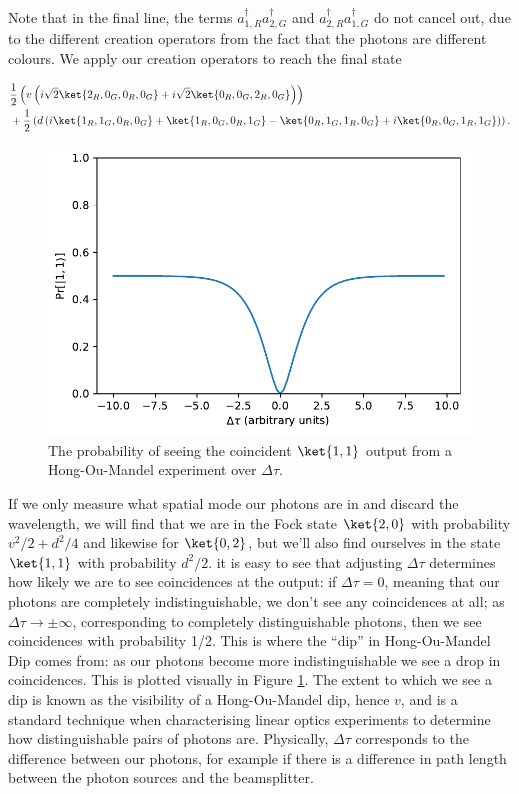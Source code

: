 Note that in the final line, the terms $a_{1,R}^\dagger a_{2,G}^\dagger$ and $a_{2,R}^\dagger a_{1,G}^\dagger$ do not cancel out, due to the different creation operators from the fact that the photons are different colours. We apply our creation operators to reach the final state

\begin{align}
&\frac{1}{2}\left(v\left(i\sqrt{2}\ket{2_R,0_G,0_R,0_G} +i\sqrt{2}\ket{0_R,0_G,2_R,0_G}\right)\right)\nonumber\\
&+\frac{1}{2}\left( d\left(i\ket{1_R,1_G,0_R,0_G} + \ket{1_R,0_G,0_R,1_G} - \ket{0_R,1_G,1_R,0_G}+i\ket{0_R,0_G,1_R,1_G} \right)\right).
\end{align}

\begin{figure}
\begin{center}
\includegraphics[width=0.5\linewidth]{preliminary_bs/hom_plot}
\end{center}
\caption{\label{fig:hom-plot}The probability of seeing the coincident $\ket{1,1}$ output from a Hong-Ou-Mandel experiment over $\Delta\tau$.}
\end{figure}

If we only measure what spatial mode our photons are in and discard the wavelength, we will find that we are in the Fock state $\ket{2,0}$ with probability $v^2/2 + d^2/4$ and likewise for $\ket{0,2}$, but we'll also find ourselves in the state $\ket{1,1}$ with probability $d^2/2$.  it is easy to see that adjusting $\Delta\tau$ determines how likely we are to see coincidences at the output: if $\Delta\tau=0$, meaning that our photons are completely indistinguishable, we don't see any coincidences at all; as $\Delta\tau\rightarrow\pm\infty$, corresponding to completely distinguishable photons, then we see coincidences with probability 1/2. This is where the ``dip'' in Hong-Ou-Mandel Dip comes from: as our photons become more indistinguishable we see a drop in coincidences. This is plotted visually in Figure \ref{fig:hom-plot}. The extent to which we see a dip is known as the visibility of a Hong-Ou-Mandel dip, hence $v$, and is a standard technique when characterising linear optics experiments to determine how distinguishable pairs of photons are. Physically, $\Delta\tau$ corresponds to the difference between our photons, for example if there is a difference in path length between the photon sources and the beamsplitter.


